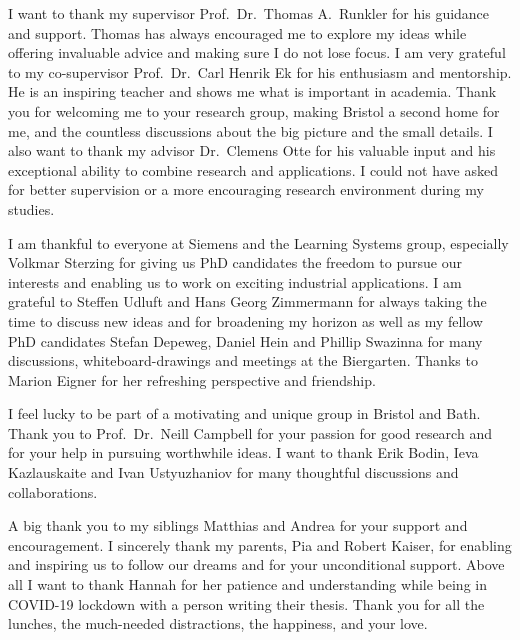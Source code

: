 \begin{Acknowledgements}
    I want to thank my supervisor Prof.~Dr.~Thomas A.~Runkler for his guidance and support.
    Thomas has always encouraged me to explore my ideas while offering invaluable advice and making sure I do not lose focus.
    I am very grateful to my co-supervisor Prof.~Dr.~Carl Henrik Ek for his enthusiasm and mentorship.
    He is an inspiring teacher and shows me what is important in academia.
    Thank you for welcoming me to your research group, making Bristol a second home for me, and the countless discussions about the big picture and the small details.
    I also want to thank my advisor Dr.~Clemens Otte for his valuable input and his exceptional ability to combine research and applications.
    I could not have asked for better supervision or a more encouraging research environment during my studies.

    I am thankful to everyone at Siemens and the Learning Systems group, especially Volkmar Sterzing for giving us PhD candidates the freedom to pursue our interests and enabling us to work on exciting industrial applications.
    I am grateful to Steffen Udluft and Hans Georg Zimmermann for always taking the time to discuss new ideas and for broadening my horizon as well as my fellow PhD candidates Stefan Depeweg, Daniel Hein and Phillip Swazinna for many discussions, whiteboard-drawings and meetings at the Biergarten.
    Thanks to Marion Eigner for her refreshing perspective and friendship.

    I feel lucky to be part of a motivating and unique group in Bristol and Bath.
    Thank you to Prof.~Dr.~Neill Campbell for your passion for good research and for your help in pursuing worthwhile ideas.
    I want to thank Erik Bodin, Ieva Kazlauskaite and Ivan Ustyuzhaniov for many thoughtful discussions and collaborations.

    A big thank you to my siblings Matthias and Andrea for your support and encouragement.
    I sincerely thank my parents, Pia and Robert Kaiser, for enabling and inspiring us to follow our dreams and for your unconditional support.
    Above all I want to thank Hannah for her patience and understanding while being in COVID-19 lockdown with a person writing their thesis.
    Thank you for all the lunches, the much-needed distractions, the happiness, and your love.
\end{Acknowledgements}

\listoftodos
\todototoc

\tableofcontents
